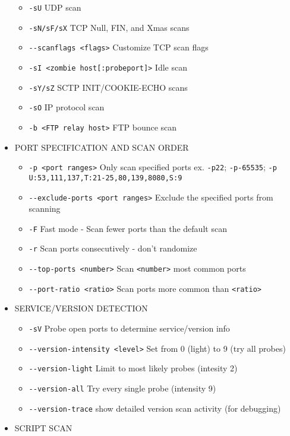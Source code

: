 \begin{itemize}
\begin{itemize}
        \item \verb|-sU| UDP scan
        \item \verb|-sN/sF/sX| TCP Null, FIN, and Xmas scans
        \item \verb|--scanflags <flags>| Customize TCP scan flags
        \item \verb|-sI <zombie host[:probeport]>| Idle scan
        \item \verb|-sY/sZ| SCTP INIT/COOKIE-ECHO scans
        \item \verb|-sO| IP protocol scan
        \item \verb|-b <FTP relay host>| FTP bounce scan
    \end{itemize}
    \item PORT SPECIFICATION AND SCAN ORDER
    \begin{itemize}
        \item \verb|-p <port ranges>| Only scan specified ports ex. \verb|-p22|; \verb|-p-65535|; \verb|-p U:53,111,137,T:21-25,80,139,8080,S:9|
        \item \verb|--exclude-ports <port ranges>| Exclude the specified ports from scanning
        \item \verb|-F| Fast mode - Scan fewer ports than the default scan
        \item \verb|-r| Scan ports consecutively - don't randomize
        \item \verb|--top-ports <number>| Scan \verb|<number>| most common ports
        \item \verb|--port-ratio <ratio>| Scan ports more common than \verb|<ratio>| 
    \end{itemize}
    \item SERVICE/VERSION DETECTION
    \begin{itemize}
        \item \verb|-sV| Probe open ports to determine service/version info
        \item \verb|--version-intensity <level>| Set from 0 (light) to 9 (try all probes)
        \item \verb|--version-light| Limit to most likely probes (intesity 2)
        \item \verb|--version-all| Try every single probe (intensity 9)
        \item \verb|--version-trace| show detailed version scan activity (for debugging)
    \end{itemize}
    \item SCRIPT SCAN
    \begin{itemize}

\end{itemize}
\end{itemize}
